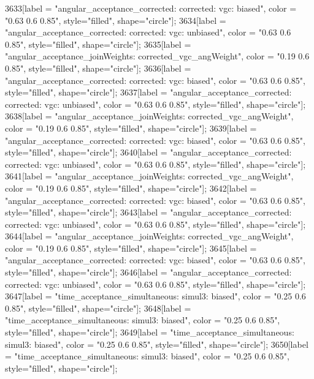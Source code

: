 {	3633[label = "angular_acceptance_corrected\nangacc: corrected\ncsp: vgc\ntrigger: biased", color = "0.63 0.6 0.85", style="filled", shape="circle"];
	3634[label = "angular_acceptance_corrected\nangacc: corrected\ncsp: vgc\ntrigger: unbiased", color = "0.63 0.6 0.85", style="filled", shape="circle"];
	3635[label = "angular_acceptance_joinWeights\nwflag: corrected_vgc_angWeight", color = "0.19 0.6 0.85", style="filled", shape="circle"];
	3636[label = "angular_acceptance_corrected\nangacc: corrected\ncsp: vgc\ntrigger: biased", color = "0.63 0.6 0.85", style="filled", shape="circle"];
	3637[label = "angular_acceptance_corrected\nangacc: corrected\ncsp: vgc\ntrigger: unbiased", color = "0.63 0.6 0.85", style="filled", shape="circle"];
	3638[label = "angular_acceptance_joinWeights\nwflag: corrected_vgc_angWeight", color = "0.19 0.6 0.85", style="filled", shape="circle"];
	3639[label = "angular_acceptance_corrected\nangacc: corrected\ncsp: vgc\ntrigger: biased", color = "0.63 0.6 0.85", style="filled", shape="circle"];
	3640[label = "angular_acceptance_corrected\nangacc: corrected\ncsp: vgc\ntrigger: unbiased", color = "0.63 0.6 0.85", style="filled", shape="circle"];
	3641[label = "angular_acceptance_joinWeights\nwflag: corrected_vgc_angWeight", color = "0.19 0.6 0.85", style="filled", shape="circle"];
	3642[label = "angular_acceptance_corrected\nangacc: corrected\ncsp: vgc\ntrigger: biased", color = "0.63 0.6 0.85", style="filled", shape="circle"];
	3643[label = "angular_acceptance_corrected\nangacc: corrected\ncsp: vgc\ntrigger: unbiased", color = "0.63 0.6 0.85", style="filled", shape="circle"];
	3644[label = "angular_acceptance_joinWeights\nwflag: corrected_vgc_angWeight", color = "0.19 0.6 0.85", style="filled", shape="circle"];
	3645[label = "angular_acceptance_corrected\nangacc: corrected\ncsp: vgc\ntrigger: biased", color = "0.63 0.6 0.85", style="filled", shape="circle"];
	3646[label = "angular_acceptance_corrected\nangacc: corrected\ncsp: vgc\ntrigger: unbiased", color = "0.63 0.6 0.85", style="filled", shape="circle"];
	3647[label = "time_acceptance_simultaneous\ntimeacc: simul3\ntrigger: biased", color = "0.25 0.6 0.85", style="filled", shape="circle"];
	3648[label = "time_acceptance_simultaneous\ntimeacc: simul3\ntrigger: biased", color = "0.25 0.6 0.85", style="filled", shape="circle"];
	3649[label = "time_acceptance_simultaneous\ntimeacc: simul3\ntrigger: biased", color = "0.25 0.6 0.85", style="filled", shape="circle"];
	3650[label = "time_acceptance_simultaneous\ntimeacc: simul3\ntrigger: biased", color = "0.25 0.6 0.85", style="filled", shape="circle"];
}
